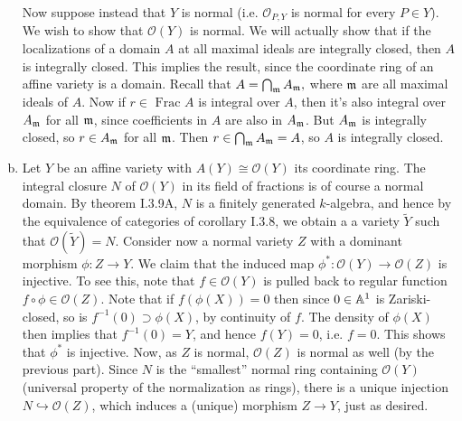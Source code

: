 \documentclass{../mathnotes}
\begin{document}
\begin{enumerate}[(a)]
        Now suppose instead that $Y$ is normal (i.e. $\mathcal{O}_{P,Y}$ is normal for every
        $P\in Y$). We wish to show that $\mathcal{O}(Y)$ is normal. We will actually show that
        if the localizations of a domain $A$ at all maximal ideals are integrally closed,
        then $A$ is integrally closed. This implies the result, since the coordinate ring
        of an affine variety is a domain. Recall that $A = \bigcap_{\mathfrak m} A_{\mathfrak m},$ 
        where $\mathfrak m$ are all maximal ideals of $A$. Now if $r \in$ $\text{Frac }A$ is integral over
        $A$, then it's also integral over $A_{\mathfrak m}$ for all $\mathfrak m$, since coefficients in $A$
        are also in $A_{\mathfrak m}$. But $A_{\mathfrak m}$ is integrally closed, so $r \in A_{\mathfrak m}$
        for all $\mathfrak m$. Then $r \in \bigcap_{\mathfrak m} A_{\mathfrak m} = A$, so $A$ is integrally closed.
    \item Let $Y$ be an affine variety with $A(Y)\cong\mathcal{O}(Y)$ its coordinate ring.
        The integral closure $N$ of $\mathcal{O}(Y)$ in its field of fractions
        is of course a normal domain. By theorem I.3.9A, $N$ is a finitely generated
        $k$-algebra, and hence by the equivalence of categories of corollary I.3.8,
        we obtain a a variety $\tilde Y$ such that $\mathcal{O}(\tilde Y)=N$. Consider
        now a normal variety $Z$ with a dominant morphism $\phi:Z\to Y$.
        We claim that the induced map $\phi^*:\mathcal{O}(Y)\to\mathcal{O}(Z)$ is injective.
        To see this, note that $f\in\mathcal{O}(Y)$ is pulled back to regular function
        $f\circ \phi\in\mathcal{O}(Z)$.
        Note that if $f(\phi(X))=0$ then since $0\in\mathbb{A}^1$ is Zariski-closed, so is
        $f^{-1}(0)\supset\phi(X)$, by continuity of $f$. The density of $\phi(X)$ then implies that
        $f^{-1}(0)=Y$, and hence $f(Y)=0$, i.e. $f=0$. This shows that $\phi^*$
        is injective.
        Now, as $Z$ is normal, $\mathcal{O}(Z)$ is normal as well (by the previous part). Since
        $N$ is the ``smallest'' normal ring containing $\mathcal{O}(Y)$ (universal property
        of the normalization as rings), there is a unique
        injection $N\hookrightarrow\mathcal{O}(Z)$, which induces a (unique) morphism
        $Z\to Y$, just as desired.

\end{enumerate}
\end{document}
